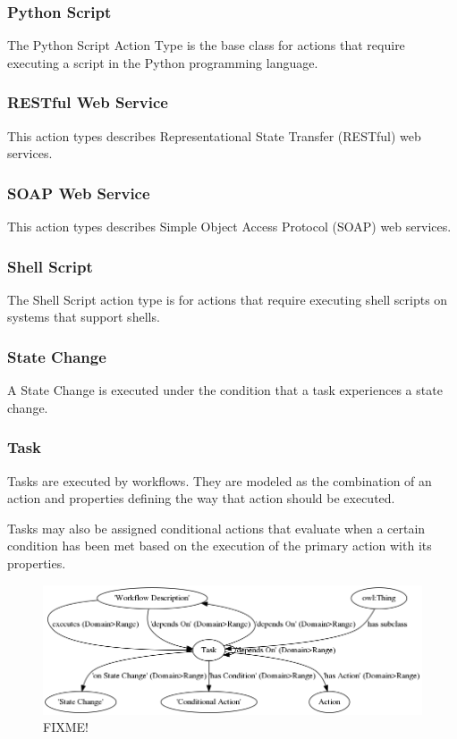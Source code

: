 			\subsubsection{
			Python Script
			}
			The Python Script Action Type is the base class for actions that require executing a script in the Python programming language.
			\subsubsection{
			RESTful Web Service
			}
			This action types describes Representational State Transfer (RESTful) web services.
			\subsubsection{
			SOAP Web Service
			}
			This action types describes Simple Object Access Protocol (SOAP) web services.
			\subsubsection{
			Shell Script
			}
			The Shell Script action type is for actions that require executing shell scripts on systems that support shells.
			\subsubsection{
			State Change
			}
			A State Change is executed under the condition that a task experiences a state change.
\subsubsection{Task}

Tasks are executed by workflows. They are modeled as the combination of an
action and properties defining the way that action should be executed.

Tasks may also be assigned conditional actions that evaluate when a certain
condition has been met based on the execution of the primary action with its properties.

\begin{figure}[htbp]
\centering
\includegraphics[width=\textwidth]{figures/task.png}
\caption{FIXME!}
\label{task}
\end{figure}


